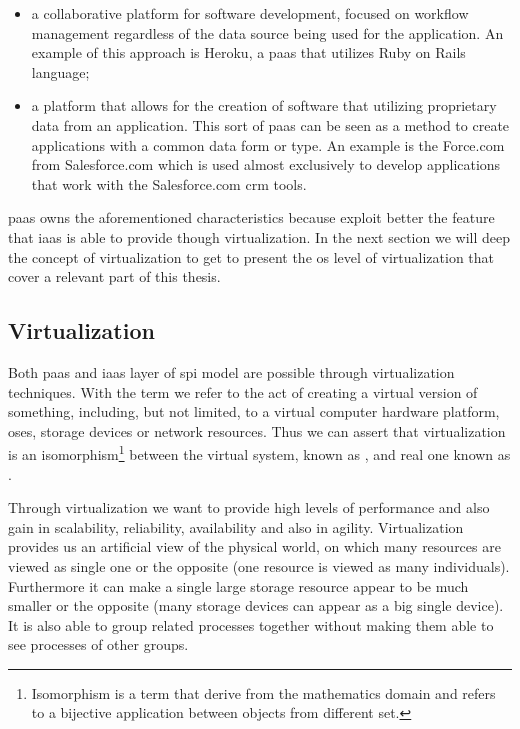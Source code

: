 \begin{itemize}
	\item{a collaborative platform for software development, focused on workflow management regardless
		of the data source being used for the application. An example of this approach is Heroku, a
		\ac{paas} that utilizes Ruby on Rails language;}
	\item{a platform that allows for the creation of software that utilizing proprietary data from an
		application. This sort of \ac{paas} can be seen as a method to create applications with a common
		data form or type. An example is the Force.com from Salesforce.com which is used almost exclusively
		to develop applications that work with the Salesforce.com \ac{crm} tools.}
\end{itemize}

\ac{paas} owns the aforementioned characteristics because exploit better the feature that \ac{iaas}
is able to provide though virtualization. In the next section we will deep the concept of virtualization
to get to present the \acs{os} level of virtualization that cover a relevant part of this thesis.

\subsection{Virtualization}
\label{sec:problemSpace-paas-virtualization}
Both \ac{paas} and \ac{iaas} layer of \ac{spi} model are possible through virtualization techniques.
With the term  we refer to the act of creating a virtual version of something,
including, but not limited, to a virtual computer hardware platform, \acs{os}es, storage devices or
network resources. Thus we can assert that virtualization is an isomorphism\footnote{Isomorphism is
a term that derive from the mathematics	domain and refers to a bijective application between objects
from different set.} between the virtual system, known as , and real one known as
.

Through virtualization we want to provide high levels of performance and also gain in scalability,
reliability, availability and also in agility. Virtualization provides us an artificial view of the
physical world, on which many resources are viewed as single one or the opposite (one resource
is viewed as many individuals). Furthermore it can make a single large storage resource appear to be much
smaller or the opposite (many storage devices can appear as a big single device). It is also able to group
related processes together without making them able to see processes of other groups.

